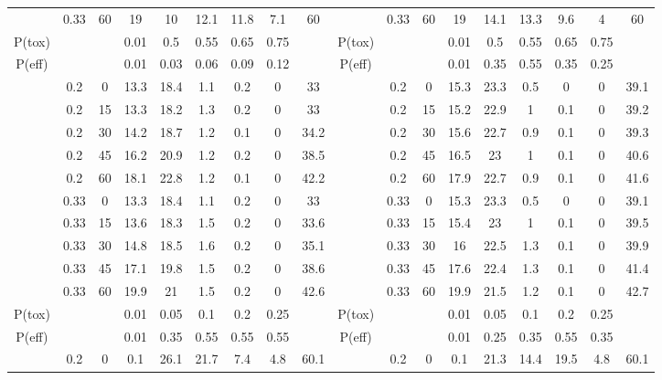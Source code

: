 \begin{table}
{\begin{tabular}[t]{cccccccc>{}c|ccccccccc}
			\multirow{-10}{*}{\centering\arraybackslash 3} & 0.33 & 60 & 19 & 10 & 12.1 & 11.8 & 7.1 & 60 & \multirow{-10}{*}{\centering\arraybackslash 9} & 0.33 & 60 & 19 & 14.1 & 13.3 & 9.6 & 4 & 60\\
			\cmidrule{1-18}
			P(tox) &  &  & 0.01 & 0.5 & 0.55 & 0.65 & 0.75 &  & P(tox) &  &  & 0.01 & 0.5 & 0.55 & 0.65 & 0.75 \vphantom{1} & \\
			\cmidrule{1-18}
			P(eff) &  &  & 0.01 & 0.03 & 0.06 & 0.09 & 0.12 &  & P(eff) &  &  & 0.01 & 0.35 & 0.55 & 0.35 & 0.25 & \\
			\cmidrule{1-18}
			& 0.2 & 0 & 13.3 & 18.4 & 1.1 & 0.2 & 0 & 33 &  & 0.2 & 0 & 15.3 & 23.3 & 0.5 & 0 & 0 & 39.1\\
			
			& 0.2 & 15 & 13.3 & 18.2 & 1.3 & 0.2 & 0 & 33 &  & 0.2 & 15 & 15.2 & 22.9 & 1 & 0.1 & 0 & 39.2\\
			
			& 0.2 & 30 & 14.2 & 18.7 & 1.2 & 0.1 & 0 & 34.2 &  & 0.2 & 30 & 15.6 & 22.7 & 0.9 & 0.1 & 0 & 39.3\\
			
			& 0.2 & 45 & 16.2 & 20.9 & 1.2 & 0.2 & 0 & 38.5 &  & 0.2 & 45 & 16.5 & 23 & 1 & 0.1 & 0 & 40.6\\
			
			& 0.2 & 60 & 18.1 & 22.8 & 1.2 & 0.1 & 0 & 42.2 &  & 0.2 & 60 & 17.9 & 22.7 & 0.9 & 0.1 & 0 & 41.6\\
			
			& 0.33 & 0 & 13.3 & 18.4 & 1.1 & 0.2 & 0 & 33 &  & 0.33 & 0 & 15.3 & 23.3 & 0.5 & 0 & 0 & 39.1\\
			
			& 0.33 & 15 & 13.6 & 18.3 & 1.5 & 0.2 & 0 & 33.6 &  & 0.33 & 15 & 15.4 & 23 & 1 & 0.1 & 0 & 39.5\\
			
			& 0.33 & 30 & 14.8 & 18.5 & 1.6 & 0.2 & 0 & 35.1 &  & 0.33 & 30 & 16 & 22.5 & 1.3 & 0.1 & 0 & 39.9\\
			
			& 0.33 & 45 & 17.1 & 19.8 & 1.5 & 0.2 & 0 & 38.6 &  & 0.33 & 45 & 17.6 & 22.4 & 1.3 & 0.1 & 0 & 41.4\\
			
			\multirow{-10}{*}{\centering\arraybackslash 4} & 0.33 & 60 & 19.9 & 21 & 1.5 & 0.2 & 0 & 42.6 & \multirow{-10}{*}{\centering\arraybackslash 10} & 0.33 & 60 & 19.9 & 21.5 & 1.2 & 0.1 & 0 & 42.7\\
			\cmidrule{1-18}
			P(tox) &  &  & 0.01 & 0.05 & 0.1 & 0.2 & 0.25 &  & P(tox) &  &  & 0.01 & 0.05 & 0.1 & 0.2 & 0.25 & \\
			\cmidrule{1-18}
			P(eff) &  &  & 0.01 & 0.35 & 0.55 & 0.55 & 0.55 &  & P(eff) &  &  & 0.01 & 0.25 & 0.35 & 0.55 & 0.35 \vphantom{1} & \\
			\cmidrule{1-18}
			& 0.2 & 0 & 0.1 & 26.1 & 21.7 & 7.4 & 4.8 & 60.1 &  & 0.2 & 0 & 0.1 & 21.3 & 14.4 & 19.5 & 4.8 & 60.1\\
			

\end{tabular}}
\end{table}
